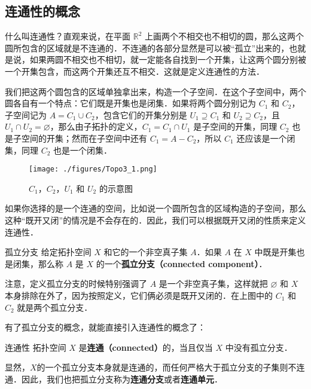 

\subsection{连通性的概念}
什么叫连通性？直观来说，在平面 $\mathbb{R}^2$ 上画两个不相交也不相切的圆，那么这两个圆所包含的区域就是不连通的．不连通的各部分显然是可以被“孤立”出来的，也就是说，如果两圆不相交也不相切，就一定能各自找到一个开集，让这两个圆分别被一个开集包含，而这两个开集还互不相交．这就是定义连通性的方法．

我们把这两个圆包含的区域单独拿出来，构造一个子空间．在这个子空间中，两个圆各自有一个特点：它们既是开集也是闭集．如果将两个圆分别记为 $C_1$ 和 $C_2$，子空间记为 $A=C_1\cup C_2$，包含它们的开集分别是 $U_1\supseteq C_1$ 和 $U_2\supseteq C_2$，且 $U_1\cap U_2=\varnothing$，那么由子拓扑的定义，$C_1=C_1\cap U_1$ 是子空间的开集，同理 $C_2$ 也是子空间的开集；然而在子空间中还有 $C_1=A-C_2$，所以 $C_1$ 还应该是一个闭集，同理 $C_2$ 也是一个闭集．

\begin{figure}[ht]
\centering
\texttt{[image: ./figures/Topo3\_1.png]}
\caption{$C_1$，$C_2$，$U_1$ 和 $U_2$ 的示意图} \label{Topo3_fig1}
\end{figure}

如果你选择的是一个连通的空间，比如说一个圆所包含的区域构造的子空间，那么这种“既开又闭”的情况是不会存在的．因此，我们可以根据既开又闭的性质来定义连通性．

\begin{definition}{孤立分支}
给定拓扑空间 $X$ 和它的一个非空真子集 $A$．如果 $A$ 在 $X$ 中既是开集也是闭集，那么称 $A$ 是 $X$ 的一个\textbf{孤立分支（connected component）}．
\end{definition}

注意，定义孤立分支的时候特别强调了 $A$ 是一个非空真子集，这样就把 $\varnothing$ 和 $X$ 本身排除在外了，因为按照定义，它们俩必须是既开又闭的．在上图中的 $C_1$ 和 $C_2$ 就是两个孤立分支．

有了孤立分支的概念，就能直接引入连通性的概念了：

\begin{definition}{连通性}
拓扑空间 $X$ 是\textbf{连通（connected）}的，当且仅当 $X$ 中没有孤立分支．
\end{definition}

显然，$X$的一个孤立分支本身就是连通的，而任何严格大于孤立分支的子集则不连通．因此，我们也把孤立分支称为\textbf{连通分支}或者\textbf{连通单元}．

